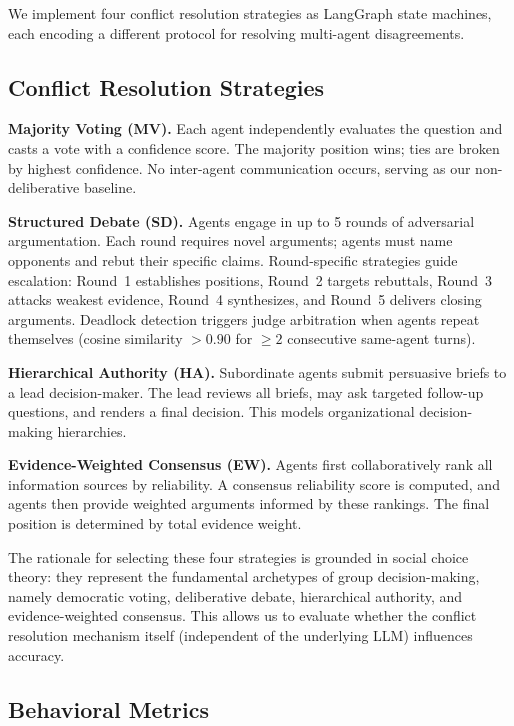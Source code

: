 \documentclass[11pt]{article}
\begin{document}
We implement four conflict resolution strategies as LangGraph state machines, each encoding a different protocol for resolving multi-agent disagreements.

\subsection{Conflict Resolution Strategies}

\textbf{Majority Voting (MV).} Each agent independently evaluates the question and casts a vote with a confidence score. The majority position wins; ties are broken by highest confidence. No inter-agent communication occurs, serving as our non-deliberative baseline.

\textbf{Structured Debate (SD).} Agents engage in up to 5 rounds of adversarial argumentation. Each round requires novel arguments; agents must name opponents and rebut their specific claims. Round-specific strategies guide escalation: Round~1 establishes positions, Round~2 targets rebuttals, Round~3 attacks weakest evidence, Round~4 synthesizes, and Round~5 delivers closing arguments. Deadlock detection triggers judge arbitration when agents repeat themselves (cosine similarity $> 0.90$ for $\geq 2$ consecutive same-agent turns).

\textbf{Hierarchical Authority (HA).} Subordinate agents submit persuasive briefs to a lead decision-maker. The lead reviews all briefs, may ask targeted follow-up questions, and renders a final decision. This models organizational decision-making hierarchies.

\textbf{Evidence-Weighted Consensus (EW).} Agents first collaboratively rank all information sources by reliability. A consensus reliability score is computed, and agents then provide weighted arguments informed by these rankings. The final position is determined by total evidence weight.

The rationale for selecting these four strategies is grounded in social choice theory: they represent the fundamental archetypes of group decision-making, namely democratic voting, deliberative debate, hierarchical authority, and evidence-weighted consensus. This allows us to evaluate whether the conflict resolution mechanism itself (independent of the underlying LLM) influences accuracy.

\subsection{Behavioral Metrics}
\end{document}
